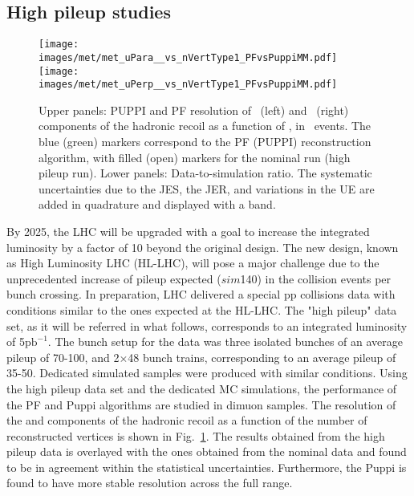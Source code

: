 \subsection*{High pileup studies}
\noindent
\justify
\begin{figure}[!htp]
  \centering
   \texttt{[image: images/met/met\_uPara\_\_vs\_nVertType1\_PFvsPuppiMM.pdf]}
   \texttt{[image: images/met/met\_uPerp\_\_vs\_nVertType1\_PFvsPuppiMM.pdf]}
   \caption{Upper panels: PUPPI and PF \ptmiss resolution of \upar\ (left) and \uperp\ (right) components of the hadronic recoil as a function of \nvtx, in \Zmm\ events. 
The blue (green) markers correspond to the PF (PUPPI) \ptmiss reconstruction algorithm, with filled (open) markers for the nominal run (high pileup run).  
Lower panels: Data-to-simulation ratio. The systematic uncertainties due to the JES, the JER, and variations in the UE are added in quadrature and displayed with a band.}
   \label{fig:Res_vs_PileUpVeryHighPU}
\end{figure}                                                                                                                                                                                   
By 2025, the LHC will be upgraded with a goal to increase the integrated luminosity by a factor of 10 beyond the original design. 
The new design, known as High Luminosity LHC (HL-LHC), will pose a major challenge due to the unprecedented increase of pileup expected ($sim$140) in the collision events per bunch crossing. 
In preparation, LHC delivered a special pp collisions data with conditions similar to the ones expected at the HL-LHC. 
The "high pileup" data set, as it will be referred in what follows, corresponds to an integrated luminosity of 5$\mathrm{pb}^{-1}$. 
The bunch setup for the data was three isolated bunches of an average pileup of 70-100, and 2$\times$48 bunch trains, corresponding to an average pileup of 35-50. 
Dedicated simulated samples were produced with similar conditions. 
Using the high pileup data set and the dedicated MC simulations, the performance of the PF \ptmiss and Puppi \ptmiss algorithms are studied in dimuon samples.
The \ptmiss resolution of the \upar and \uperp components of the hadronic recoil as a function of the number of reconstructed
vertices is shown in Fig.~\ref{fig:Res_vs_PileUpVeryHighPU}. 
The results obtained from the high pileup data is overlayed with the ones obtained from the nominal data and found to be in agreement within the statistical uncertainties. 
Furthermore, the Puppi \ptmiss is found to have more stable resolution across the full range.
\clearpage
